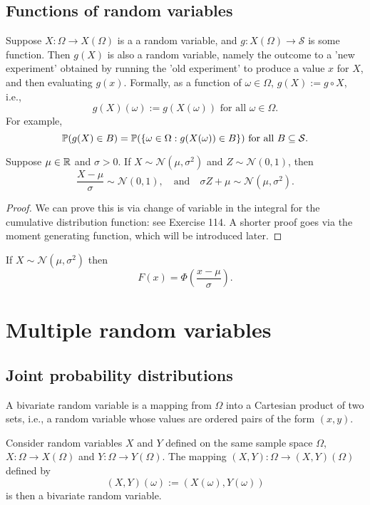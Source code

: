 \documentclass[10pt, a4paper]{article}
\begin{document}
\subsection{Functions of random variables}
Suppose $X : \Omega \rightarrow X(\Omega)$ is a a random variable,
and $g : X(\Omega) \rightarrow \mathcal{S}$ is some function.
Then $g(X)$ is also a random variable,
namely the outcome to a 'new experiment' obtained by running the 'old experiment' to produce a value $x$ for $X$,
and then evaluating $g(x)$.
Formally,
as a function of $\omega \in \Omega$,
$g(X) := g \circ X$, i.e.,
\[
g(X)(\omega) := g(X(\omega))\text{ for all } \omega \in \Omega.
\]
For example,
\[
\P(g(X) \in B) = \P(\{\omega \in \Omega : g(X(\omega)) \in B\})\text{ for all } B \subseteq \mathcal{S}.
\]

\begin{theorem}
    Suppose $\mu \in \R$ and $\sigma > 0$.
    If $X \sim \mathcal{N}(\mu, \sigma^ 2)$ and $Z \sim \mathcal{N}(0, 1)$,
    then
    \[
    \frac{X - \mu}{\sigma} \sim \mathcal{N}(0, 1),\quad\text{and}\quad\sigma Z + \mu \sim \mathcal{N}(\mu, \sigma ^ 2).
    \]
    \begin{proof}
        We can prove this is via change of variable in the integral for the cumulative distribution function: see Exercise 114.
        A shorter proof goes via the moment generating function,
        which will be introduced later.
    \end{proof}
\end{theorem}

\begin{corollary}
    If $X \sim \mathcal{N}(\mu, \sigma ^ 2)$ then
    \[
    F(x) = \Phi\left(\frac{x - \mu}{\sigma}\right).
    \]
\end{corollary}

\newpage

\section{Multiple random variables}

\subsection{Joint probability distributions}
A bivariate random variable is a mapping from $\Omega$ into a Cartesian product of two sets,
i.e.,
a random variable whose values are ordered pairs of the form $(x, y)$.

\begin{definition}
    Consider random variables $X$ and $Y$ defined on the same sample space $\Omega$,
    $X : \Omega \rightarrow X(\Omega)$ and $Y : \Omega \rightarrow Y(\Omega)$.
    The mapping $(X, Y) : \Omega \rightarrow (X, Y)(\Omega)$ defined by
    \[
    (X, Y)(\omega) := (X(\omega), Y(\omega))
    \]
    is then a bivariate random variable.
\end{definition}
\end{document}
